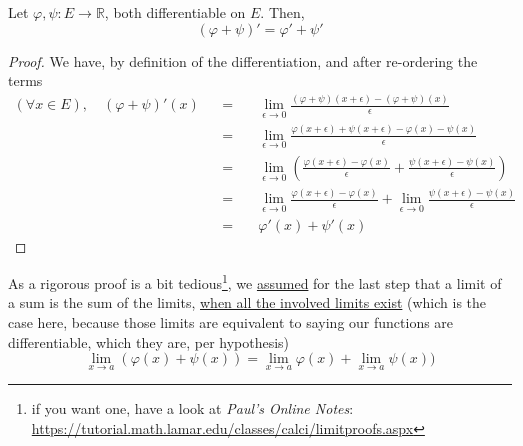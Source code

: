\documentclass[solutions.tex]{subfiles}
\begin{document}
\begin{theorem} Let $\varphi, \psi : E \rightarrow \mathbb{R}$,
both differentiable on $E$. Then,
\[
	\boxed{(\varphi+\psi)' = \varphi' + \psi'}
\]
\end{theorem}
\begin{proof} We have, by definition of the differentiation, and after
re-ordering the terms
\begin{equation*} \begin{aligned}
	(\forall x \in E),\quad(\varphi+\psi)'(x) &&=\quad&
		\lim_{\epsilon \rightarrow 0}\frac{(\varphi+\psi)(x+\epsilon)-(\varphi+\psi)(x)}{\epsilon} \\
	~ &&=\quad &
		\lim_{\epsilon \rightarrow 0}\frac{\varphi(x+\epsilon)+\psi(x+\epsilon)-\varphi(x)-\psi(x)}{\epsilon} \\
	~ &&=\quad &
		\lim_{\epsilon \rightarrow 0}\left(\frac{\varphi(x+\epsilon)-\varphi(x)}{\epsilon}+
			\frac{\psi(x+\epsilon)-\psi(x)}{\epsilon}\right) \\
	~ &&=\quad &
		\lim_{\epsilon \rightarrow 0}\frac{\varphi(x+\epsilon)-\varphi(x)}{\epsilon}
		+\lim_{\epsilon \rightarrow 0}\frac{\psi(x+\epsilon)-\psi(x)}{\epsilon} \\
	~ &&=\quad & \boxed{\varphi'(x)+\psi'(x)}
\end{aligned} \end{equation*}
\end{proof}
\begin{remark} As a rigorous proof is a bit tedious\footnote{if you want one,
have a look at \textit{Paul's Online Notes}:
\url{https://tutorial.math.lamar.edu/classes/calci/limitproofs.aspx}},
we \underline{assumed} for the last step that a limit of a sum is the
sum of the limits, \underline{when all the involved limits exist} (which
is the case here, because those limits are equivalent to saying our functions
are differentiable, which they are, per hypothesis)
\[
	\lim_{x \rightarrow a}\left(\varphi(x)+\psi(x)\right) =
		\lim_{x \rightarrow a}\varphi(x)
		+ \lim_{x \rightarrow a}\psi(x))
\]
\end{remark}
\end{document}
